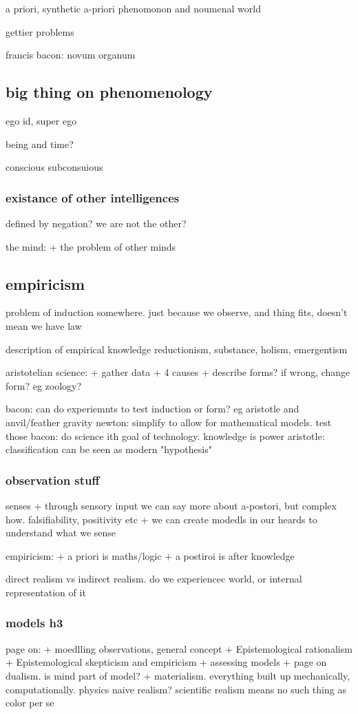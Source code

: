a priori, synthetic a-priori
phenomonon and noumenal world

gettier problems

francis bacon: novum organum

\subsection{big thing on phenomenology}
ego id, super ego

being and time?

conscious
subconsuious
\subsubsection{existance of other intelligences}
defined by negation? we are not the other?

the mind:
+ the problem of other minds

\subsection{empiricism}

problem of induction somewhere. just because we observe, and thing fits, doesn't mean we have law

description of empirical knowledge
reductionism, substance, holism, emergentism

aristotelian science:
+ gather data
+ 4 causes
+ describe forms? if wrong, change form? eg zoology?

bacon: can do experiemnts to test induction or form? eg aristotle and anvil/feather gravity
newton: simplify to allow for mathematical models. test those
bacon: do science ith goal of technology. knowledge is power
aristotle: classification can be seen as modern "hypothesis"

\subsubsection{observation stuff}
senses
+ through sensory input we can say more about a-postori, but complex how. falsifiability, positivity etc
+ we can create modedls in our heards to understand what we sense

empiricism:
+ a priori is maths/logic
+ a postiroi is after knowledge

direct realism vs indirect realism. do we experiencec world, or internal representation of it
\subsubsection{models h3}
page on:
+ moedlling observations, general concept
+ Epistemological rationalism
+ Epistemological skepticism and empiricism
+ assessing models
+ page on dualism. is mind part of model?
+ materialism. everything built up mechanically, computationally. physics
naive realism? scientific realism means no such thing as color per se

